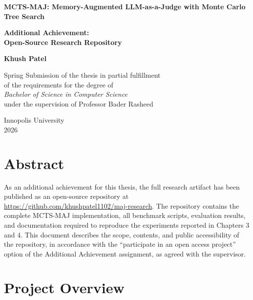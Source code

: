\documentclass[12pt,a4paper]{article}
\begin{document}
\begin{titlepage}
\begin{center}
\vspace*{3cm}

{\LARGE \textbf{MCTS-MAJ: Memory-Augmented LLM-as-a-Judge with Monte Carlo Tree Search}}

\vspace{1.5cm}

{\Large \textbf{Additional Achievement:\\ Open-Source Research Repository}}

\vspace{2cm}

{\large \textbf{Khush Patel}}

\vspace{1.5cm}

Spring Submission of the thesis in partial fulfillment\\
of the requirements for the degree of\\
\textit{Bachelor of Science in Computer Science}\\[0.5cm]
under the supervision of Professor Bader Rasheed

\vfill

Innopolis University\\
2026

\end{center}
\end{titlepage}

\section*{Abstract}

As an additional achievement for this thesis, the full research artifact has been published as an open-source repository at \url{https://github.com/khushpatel1102/maj-research}. The repository contains the complete MCTS-MAJ implementation, all benchmark scripts, evaluation results, and documentation required to reproduce the experiments reported in Chapters 3 and 4. This document describes the scope, contents, and public accessibility of the repository, in accordance with the ``participate in an open access project'' option of the Additional Achievement assignment, as agreed with the supervisor.

\section{Project Overview}
\end{document}
